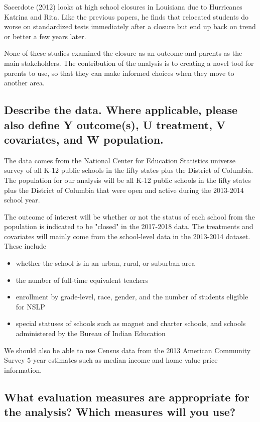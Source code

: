 \documentclass[twoside,11pt]{article}
\begin{document}
Sacerdote (2012) looks at high school closures in Louisiana due to Hurricanes Katrina and Rita. Like the previous papers, he finds that relocated students do worse on standardized tests immediately after a closure but end up back on trend or better a few years later. 

None of these studies examined the closure as an outcome and parents as the main stakeholders. The contribution of the analysis is to creating a novel tool for parents to use, so that they can make informed choices when they move to another area. 


\subsection{Describe the data. Where applicable, please also define Y outcome(s), U treatment, V covariates, and W population.}

The data comes from the National Center for Education Statistics universe survey of all K-12 public schools in the fifty states plus the District of Columbia. The population for our analysis will be all K-12 public schools in the fifty states plus the District of Columbia that were open and active during the 2013-2014 school year. 

The outcome of interest will be whether or not the status of each school from the population is indicated to be "closed" in the 2017-2018 data.
The treatments and covariates will mainly come from the school-level data in the 2013-2014 dataset. These include 
\begin{itemize}
\item whether the school is in an urban, rural, or suburban area
\item the number of full-time equivalent teachers
\item enrollment by grade-level, race, gender, and the number of students eligible for NSLP
\item special statuses of schools such as magnet and charter schools, and schools administered by the Bureau of Indian Education
\end{itemize}
We should also be able to use Census data from the 2013 American Community Survey 5-year estimates such as median income and home value price information.


\subsection{What evaluation measures are appropriate for the analysis? Which measures will you use?}
\end{document}
